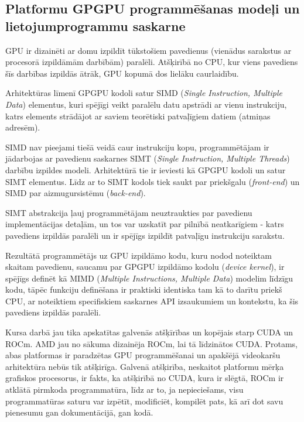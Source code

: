 \begin{center}
    \chapter{Platformu GPGPU programmēšanas modeļi un lietojumprogrammu
    saskarne}
\end{center}

GPU ir dizainēti ar domu izpildīt tūkstošiem pavedienus (vienādus sarakstus ar
procesorā izpildāmām darbībām) paralēli. Atšķirībā no CPU, kur viens pavediens
šīs darbības izpildās ātrāk, GPU kopumā dos lielāku caurlaidību.

Arhitektūras līmenī GPGPU kodoli satur SIMD (\textit{Single Instruction,
Multiple Data}) elementus, kuri spējīgi veikt paralēlu datu apstrādi ar vienu
instrukciju, katrs elements strādājot ar saviem teorētiski patvaļīgiem datiem
(atmiņas adresēm).

SIMD nav pieejami tiešā veidā caur instrukciju kopu, programmētājam ir
jādarbojas ar pavedienu saskarnes SIMT (\textit{Single Instruction, Multiple
Threads}) darbību izpildes modeli. \cite{GPGPU_gramata} Arhitektūrā tie ir
ieviesti kā GPGPU kodoli un satur SIMT elementus. Līdz ar to SIMT kodols tiek
saukt par priekšgalu (\textit{front-end}) un SIMD par aizmugursistēmu
(\textit{back-end}).

SIMT abstrakcija ļauj programmētājam neuztraukties par pavedienu
implementācijas detaļām, un tos var uzskatīt par pilnībā neatkarīgiem - katrs
pavediens izpildās paralēli un ir spējīgs izpildīt patvaļīgu instrukciju
sarakstu.

Rezultātā programmētājs uz GPU izpildāmo kodu, kuru nodod noteiktam skaitam
pavedienu, saucamu par  GPGPU izpildāmo kodolu (\textit{device kernel}), ir
spējīgs definēt kā MIMD (\textit{Multiple Instructions, Multiple Data}) modelim
līdzīgu kodu, tāpēc funkciju definēšana ir praktiski identiska tam kā to darītu
priekš CPU, ar noteiktiem specifiskiem saskarnes API izsaukumiem un kontekstu,
ka šis pavediens izpildās paralēli. \cite{kursa-darbs}

Kursa darbā jau tika apskatītas galvenās atšķīrības un kopējais starp CUDA un
ROCm.\cite{kursa-darbs} AMD jau no sākuma dizainēja ROCm, lai tā līdzinātos
CUDA. Protams, abas platformas ir paradzētas GPU programmēšanai un apakšējā
videokaršu arhitektūra nebūs tik atšķirīga. Galvenā atšķirība, neskaitot
platformu mērķa grafiskos procesorus, ir fakts, ka atšķirībā no CUDA, kura ir
slēgtā, ROCm ir atklātā pirmkoda programmatūra, līdz ar to, ja nepieciešams,
visu programmatūras saturu var izpētīt, modificiēt, kompilēt pats, kā arī dot
savu pienesumu gan dokumentācijā, gan kodā.\cite{what_is_ROCM}

